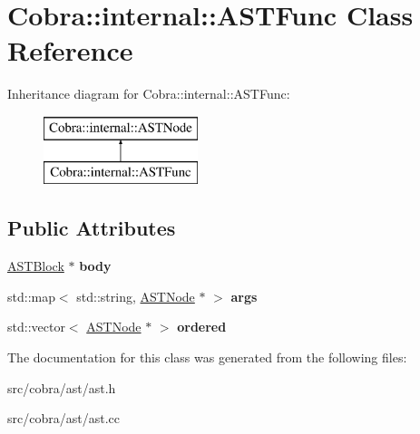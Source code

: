 \hypertarget{class_cobra_1_1internal_1_1_a_s_t_func}{\section{Cobra\+:\+:internal\+:\+:A\+S\+T\+Func Class Reference}
\label{class_cobra_1_1internal_1_1_a_s_t_func}
}
Inheritance diagram for Cobra\+:\+:internal\+:\+:A\+S\+T\+Func\+:\begin{figure}[H]
\begin{center}
\leavevmode
\includegraphics[height=2.000000cm]{class_cobra_1_1internal_1_1_a_s_t_func}
\end{center}
\end{figure}
\subsection*{Public Attributes}
\begin{DoxyCompactItemize}
\item 
\hypertarget{class_cobra_1_1internal_1_1_a_s_t_func_a6e67ed4f5bba2a0cf2a65cdc72180730}{\hyperlink{class_cobra_1_1internal_1_1_a_s_t_block}{A\+S\+T\+Block} $\ast$ {\bfseries body}}\label{class_cobra_1_1internal_1_1_a_s_t_func_a6e67ed4f5bba2a0cf2a65cdc72180730}

\item 
\hypertarget{class_cobra_1_1internal_1_1_a_s_t_func_a21e9a01b1a5d2596bbd7292bf384d18a}{std\+::map$<$ std\+::string, \hyperlink{class_cobra_1_1internal_1_1_a_s_t_node}{A\+S\+T\+Node} $\ast$ $>$ {\bfseries args}}\label{class_cobra_1_1internal_1_1_a_s_t_func_a21e9a01b1a5d2596bbd7292bf384d18a}

\item 
\hypertarget{class_cobra_1_1internal_1_1_a_s_t_func_a71cd104c6887f10e539264b9a529dd4e}{std\+::vector$<$ \hyperlink{class_cobra_1_1internal_1_1_a_s_t_node}{A\+S\+T\+Node} $\ast$ $>$ {\bfseries ordered}}\label{class_cobra_1_1internal_1_1_a_s_t_func_a71cd104c6887f10e539264b9a529dd4e}

\end{DoxyCompactItemize}


The documentation for this class was generated from the following files\+:\begin{DoxyCompactItemize}
\item 
src/cobra/ast/ast.\+h\item 
src/cobra/ast/ast.\+cc\end{DoxyCompactItemize}
